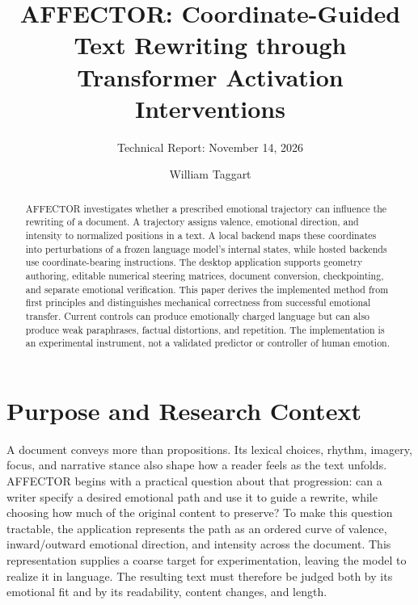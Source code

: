 \documentclass[manuscript,screen,nonacm]{acmart}
\begin{document}
\title{AFFECTOR: Coordinate-Guided Text Rewriting through Transformer
Activation Interventions}
\author{William Taggart}
\subtitle{Technical Report: November 14, 2026}
\begin{abstract}
AFFECTOR investigates whether a prescribed emotional trajectory can
influence the rewriting of a document. A trajectory assigns valence,
emotional direction, and intensity to normalized positions in a text. A
local backend maps these coordinates into perturbations of a frozen
language model's internal states, while hosted backends use
coordinate-bearing instructions. The desktop application supports
geometry authoring, editable numerical steering matrices, document
conversion, checkpointing, and separate emotional verification. This
paper derives the implemented method from first principles and
distinguishes mechanical correctness from successful emotional transfer.
Current controls can produce emotionally charged language but can also
produce weak paraphrases, factual distortions, and repetition. The
implementation is an experimental instrument, not a validated predictor
or controller of human emotion.
\end{abstract}
\maketitle
\section{Purpose and Research Context}\label{literature-review-activation-steering-and-emotion}\label{problem-formulation}

A document conveys more than propositions. Its lexical choices, rhythm, imagery, focus, and narrative stance also shape how a reader feels as the text unfolds. AFFECTOR begins with a practical question about that progression: can a writer specify a desired emotional path and use it to guide a rewrite, while choosing how much of the original content to preserve? To make this question tractable, the application represents the path as an ordered curve of valence, inward/outward emotional direction, and intensity across the document. This representation supplies a coarse target for experimentation, leaving the model to realize it in language. The resulting text must therefore be judged both by its emotional fit and by its readability, content changes, and length.
\end{document}
